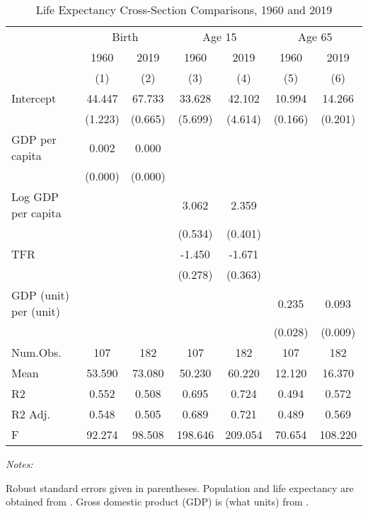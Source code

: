 \begin{table}[H]

\caption{Life Expectancy Cross-Section Comparisons, 1960 and 2019 \label{tab:hw03crosssection}}
\centering
\begin{threeparttable}
\begin{tabular}[t]{lcccccc}
\toprule
\multicolumn{1}{c}{ } & \multicolumn{2}{c}{Birth} & \multicolumn{2}{c}{Age 15} & \multicolumn{2}{c}{Age 65} \\
\cmidrule(l{3pt}r{3pt}){2-3} \cmidrule(l{3pt}r{3pt}){4-5} \cmidrule(l{3pt}r{3pt}){6-7}
\multicolumn{1}{c}{ } & \multicolumn{1}{c}{1960} & \multicolumn{1}{c}{2019} & \multicolumn{1}{c}{1960} & \multicolumn{1}{c}{2019} & \multicolumn{1}{c}{1960} & \multicolumn{1}{c}{2019} \\
\cmidrule(l{3pt}r{3pt}){2-2} \cmidrule(l{3pt}r{3pt}){3-3} \cmidrule(l{3pt}r{3pt}){4-4} \cmidrule(l{3pt}r{3pt}){5-5} \cmidrule(l{3pt}r{3pt}){6-6} \cmidrule(l{3pt}r{3pt}){7-7}
  & (1) & (2) & (3) & (4) & (5) & (6)\\
\midrule
Intercept & 44.447 & 67.733 & 33.628 & 42.102 & 10.994 & 14.266\\
 & (1.223) & (0.665) & (5.699) & (4.614) & (0.166) & (0.201)\\
GDP per capita & 0.002 & 0.000 &  &  &  & \\
 & (0.000) & (0.000) &  &  &  & \\
Log GDP per capita &  &  & 3.062 & 2.359 &  & \\
 &  &  & (0.534) & (0.401) &  & \\
TFR &  &  & -1.450 & -1.671 &  & \\
 &  &  & (0.278) & (0.363) &  & \\
GDP (unit) per (unit) &  &  &  &  & 0.235 & 0.093\\
 &  &  &  &  & (0.028) & (0.009)\\
\midrule
Num.Obs. & 107 & 182 & 107 & 182 & 107 & 182\\
Mean & 53.590 & 73.080 & 50.230 & 60.220 & 12.120 & 16.370\\
R2 & 0.552 & 0.508 & 0.695 & 0.724 & 0.494 & 0.572\\
R2 Adj. & 0.548 & 0.505 & 0.689 & 0.721 & 0.489 & 0.569\\
F & 92.274 & 98.508 & 198.646 & 209.054 & 70.654 & 108.220\\
\bottomrule
\end{tabular}
\begin{tablenotes}
\item \textit{Notes: } 
\item Robust standard errors given in parentheses. Population and life expectancy are obtained from \citet{undesaWorldPopulationProspects2022}. Gross domestic product (GDP) is (what units) from \citet{feenstraNextGenerationPenn2015}.
\end{tablenotes}
\end{threeparttable}
\end{table}
